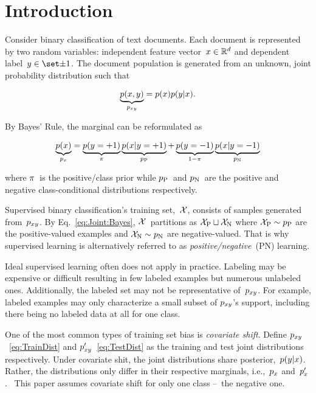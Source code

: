 \documentclass[]{subfiles}
\begin{document}
\section{Introduction}\label{sec:Introduction}

Consider binary classification of text documents.  Each document is represented by two random variables: independent feature vector~${x \in \mathbb{R}^{d}}$ and dependent label~${\y \in \domainY}$. The document population is generated from an unknown, joint probability distribution such that

\begin{equation}
  \underbrace{p(x,y)}_{p_{xy}} = p(x) p(y \vert x) \text{.} \label{eq:TrainDist}
\end{equation}

\noindent
By Bayes' Rule, the marginal can be reformulated as

\begin{equation}
  \underbrace{p(x)}_{p_{x}} = \underbrace{p(y = {+}1)}_{\pi} \underbrace{p(x \vert y = {+}1)}_{p_{\textnormal{P}}} + \underbrace{p(y = {-}1)}_{1-\pi} \underbrace{p(x \vert y = {-}1)}_{p_{\textnormal{N}}} \label{eq:Joint:Bayes}
\end{equation}

\noindent
where $\pi$~is the positive\-/class prior while $p_{\textnormal{P}}$~and $p_{\textnormal{N}}$~are the positive and negative class-conditional distributions respectively.

Supervised binary classification's training set,~$\mathcal{X}$, consists of samples generated from~$p_{xy}$. By Eq.~\eqref{eq:Joint:Bayes}, $\mathcal{X}$~partitions as ${\mathcal{X}_{\textnormal{P}} \sqcup \mathcal{X}_{\textnormal{N}}}$ where ${\mathcal{X}_{\textnormal{P}} \sim p_{\textnormal{P}}}$ are the positive-valued examples and ${\mathcal{X}_{\textnormal{N}} \sim p_{\textnormal{N}}}$ are negative-valued.  That is why supervised learning is alternatively referred to as \textit{positive\-/negative}~(PN) learning.

Ideal supervised learning often does not apply in practice.  Labeling may be expensive or difficult resulting in few labeled examples but numerous unlabeled ones.  Additionally, the labeled set may not be representative of~$p_{xy}$.  For example, labeled examples may only characterize a small subset of $p_{xy}$'s support, including there being no labeled data at all for one class.

One of the most common types of training set bias is \textit{covariate shift}. Define $p_{xy}$~\eqref{eq:TrainDist} and ${p_{xy}'}$~\eqref{eq:TestDist} as the training and test joint distributions respectively.  Under covariate shit, the joint distributions share posterior,~${p(y \vert x)}$. Rather, the distributions only differ in their respective marginals, i.e.,~${p_{x}}$ and~$p_{x}'$.~\cite{Huang:2006}  This paper assumes covariate shift for only one class --~the negative one.
\end{document}
